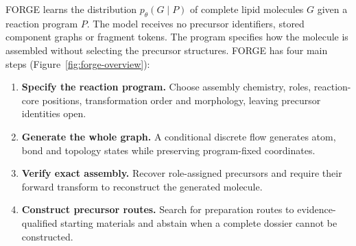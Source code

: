 \documentclass{article}
\theoremstyle{definition}
\begin{document}
FORGE learns the distribution $p_\theta(G\mid P)$ of complete lipid molecules $G$ given a
reaction program $P$. The model receives no precursor identifiers, stored component graphs or
fragment tokens. The program specifies how the molecule is assembled without selecting the
precursor structures. FORGE has four main steps (Figure~\ref{fig:forge-overview}):
\begin{enumerate}
    \item \textbf{Specify the reaction program.} Choose assembly chemistry, roles, reaction-core
    positions, transformation order and morphology, leaving precursor identities open.
    \item \textbf{Generate the whole graph.} A conditional discrete flow generates atom, bond and
    topology states while preserving program-fixed coordinates.
    \item \textbf{Verify exact assembly.} Recover role-assigned precursors and require their forward
    transform to reconstruct the generated molecule.
    \item \textbf{Construct precursor routes.} Search for preparation routes to evidence-qualified
    starting materials and abstain when a complete dossier cannot be constructed.
\end{enumerate}
\end{document}
